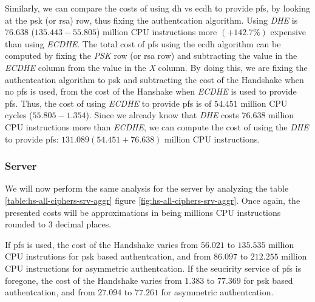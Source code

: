 \documentclass{llncs}
\begin{document}
Similarly, we can compare the costs of using \gls{dh} vs \gls{ecdh} to provide \gls{pfs}, by
looking at the \gls{psk} (or \gls{rsa}) row, thus fixing the authentcation algorithm. Using \textit{DHE} is 
$76.638$ ($135.443 - 55.805$) million CPU instructions more $(+142.7\%)$ expensive than using \textit{ECDHE}. 
The total cost of \gls{pfs}
using the \gls{ecdh} algorithm can be computed by fixing the \textit{PSK} row (or \gls{rsa} row) 
and subtracting the value in the \textit{ECDHE} column from the value in the \textit{X} column. By doing this, we are 
fixing the authentcation algorithm to \gls{psk} and subtracting the cost of the Handshake when no \gls{pfs} is used, 
from the cost of the Hanshake when \textit{ECDHE} is used to provide \gls{pfs}. Thus, the cost of using \textit{ECDHE}
to provide \gls{pfs} is of $54.451$ million CPU cycles ($55.805-1.354$). Since we already know that \textit{DHE} costs
$76.638$ million CPU instructions more than \textit{ECDHE}, we can compute the cost of using the \textit{DHE} to
provide \gls{pfs}: $131.089 (54.451+76.638)$ million CPU instructions.

\subsubsection{Server}

We will now perform the same analysis for the server by analyzing the table \ref{table:hs-all-ciphers-srv-aggr} 
figure \ref{fig:hs-all-ciphers-srv-aggr}. Once again, the presented costs will be approximations in
being millions CPU instructions rounded to $3$ decimal places.

If \gls{pfs} is used, the cost of the Handshake varies from $56.021$ to $135.535$ 
million CPU instrutions for \gls{psk} based authentcation, and from $86.097$ to $212.255$ million CPU instructions for 
asymmetric authentcation. If the seucirity service of \gls{pfs} is foregone, the cost
of the Handshake varies from $1.383$  to $77.369$ for \gls{psk} based authentcation,
and from $27.094$ to $77.261$ for asymmetric authentcation.
\end{document}
